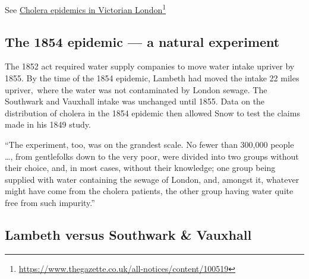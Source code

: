 \documentclass[
  10pt,
  b5paper]{book}
\begin{document}
See \href{https://www.thegazette.co.uk/all-notices/content/100519}{Cholera epidemics in Victorian London}\footnote{\url{https://www.thegazette.co.uk/all-notices/content/100519}}

\hypertarget{the-1854-epidemic-a-natural-experiment}{%
\subsection*{The 1854 epidemic --- a natural experiment}\label{the-1854-epidemic-a-natural-experiment}}

The 1852 act required water supply companies to move water intake
upriver by 1855. By the time of the 1854 epidemic, Lambeth had
moved the intake 22 miles upriver,~where the water was not
contaminated by London sewage. The Southwark and Vauxhall intake
was unchanged until 1855. Data on the distribution of cholera in
the 1854 epidemic then allowed Snow to test the claims made in his
1849 study.

``The experiment, too, was on the grandest scale. No fewer than 300,000 people \ldots, from gentlefolks down to the very poor, were divided into two groups without their choice, and, in most cases, without their knowledge; one group being supplied with water containing the sewage of London, and, amongst it, whatever might have come from the cholera patients, the other group having water quite free from such impurity.''

\hypertarget{lambeth-versus-southwark-vauxhall}{%
\subsection*{Lambeth versus Southwark \& Vauxhall}\label{lambeth-versus-southwark-vauxhall}}
\end{document}

